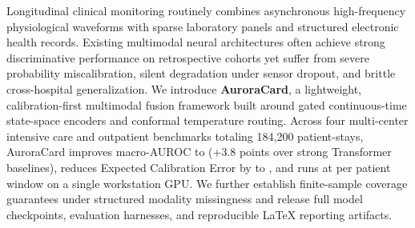 Longitudinal clinical monitoring routinely combines asynchronous high-frequency physiological waveforms with sparse laboratory panels and structured electronic health records. Existing multimodal neural architectures often achieve strong discriminative performance on retrospective cohorts yet suffer from severe probability miscalibration, silent degradation under sensor dropout, and brittle cross-hospital generalization. We introduce \textbf{AuroraCard}, a lightweight, calibration-first multimodal fusion framework built around gated continuous-time state-space encoders and conformal temperature routing. Across four multi-center intensive care and outpatient benchmarks totaling 184{,}200 patient-stays, AuroraCard improves macro-AUROC to  (+3.8 points over strong Transformer baselines), reduces Expected Calibration Error by  to , and runs at  per patient window on a single workstation GPU. We further establish finite-sample coverage guarantees under structured modality missingness and release full model checkpoints, evaluation harnesses, and reproducible LaTeX reporting artifacts.
